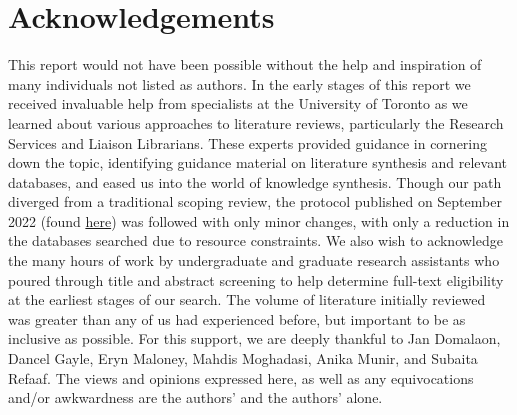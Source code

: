 \documentclass[12pt, oneside]{report}
\begin{document}
      \vskip -8pt{}%
   
      \vskip -8pt{}%
   
  \vskip 15pt
  {}%
      \vskip 1pt{}%
   
      \vskip -8pt{}%
   
      \vskip -8pt{}%
   
  \vskip 15pt

\newpage


\section*{Acknowledgements}

  This report would not have been possible without the help and
  inspiration of many individuals not listed as authors. In the early
  stages of this report we received invaluable help from specialists at
  the University of Toronto as we learned about various approaches to
  literature reviews, particularly the Research Services and Liaison
  Librarians. These experts provided guidance in cornering down the
  topic, identifying guidance material on literature synthesis and
  relevant databases, and eased us into the world of knowledge
  synthesis. Though our path diverged from a traditional scoping review,
  the protocol published on September 2022 (found
  \href{https://osf.io/rsb92}{here}) was followed with only minor
  changes, with only a reduction in the databases searched due to
  resource constraints. We also wish to acknowledge the many hours of
  work by undergraduate and graduate research assistants who poured
  through title and abstract screening to help determine full-text
  eligibility at the earliest stages of our search. The volume of
  literature initially reviewed was greater than any of us had
  experienced before, but important to be as inclusive as possible. For
  this support, we are deeply thankful to Jan Domalaon, Dancel Gayle,
  Eryn Maloney, Mahdis Moghadasi, Anika Munir, and Subaita Refaaf. The
  views and opinions expressed here, as well as any equivocations and/or
  awkwardness are the authors' and the authors' alone.
\end{document}
